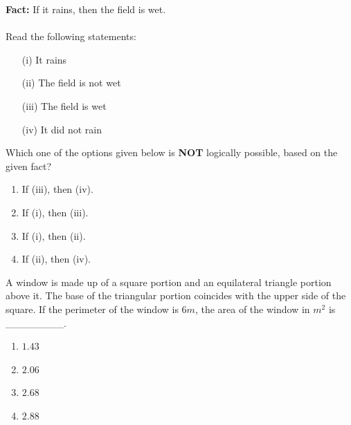     \item \textbf{Fact:} If it rains, then the field is wet. \\ \\ Read the following statements:
        \begin{itemize}
            \item[(i)] It rains
            \item[(ii)] The field is not wet
            \item[(iii)] The field is wet
            \item[(iv)] It did not rain
        \end{itemize}

        Which one of the options given below is \textbf{NOT} logically possible, based on the given fact?
        \begin{enumerate}
            \item If (iii), then (iv).
            \item If (i), then (iii).
            \item If (i), then (ii).
            \item If (ii), then (iv).
        \end{enumerate}    
    \item \label{5} A window is made up of a square portion and an equilateral triangle portion above it. The base of the triangular portion coincides with the upper side of the square. If the perimeter of the window is $6 m$, the area of the window in $m^2$ is \_\_\_\_\_\_\_\_.
        \begin{enumerate}
            \item $1.43$
            \item $2.06$
            \item $2.68$
            \item $2.88$
        \end{enumerate}

